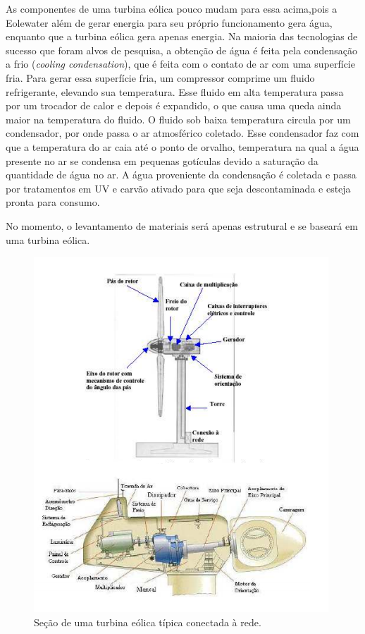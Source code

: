 
As componentes de uma turbina eólica pouco mudam para essa acima,pois a Eolewater além de gerar energia para seu próprio
funcionamento gera água, enquanto que a turbina eólica gera apenas energia. Na maioria das tecnologias de sucesso que foram alvos de pesquisa,
a obtenção de água é feita pela condensação  a frio (\textit{cooling condensation}), que é feita com o contato de 
ar com uma superfície fria. Para gerar essa superfície fria, um compressor comprime um fluido refrigerante, elevando sua
temperatura. Esse fluido em alta temperatura passa por um trocador de calor e depois é expandido, o que causa uma queda 
ainda maior na temperatura do fluido. O fluido sob baixa temperatura circula por um condensador, por onde passa o ar 
atmosférico coletado. Esse condensador faz com que a temperatura do ar caia até o ponto de orvalho, temperatura na qual a
água presente no ar se condensa em pequenas gotículas devido a saturação da quantidade de água no ar. A água proveniente
da condensação é coletada e passa por tratamentos em UV e carvão ativado para que seja descontaminada e esteja pronta para
consumo.



No momento, o levantamento de materiais será apenas estrutural e se baseará em uma turbina eólica.

\begin{figure}[!htbp]
\centering
\includegraphics[scale=0.80]{editaveis/figuras/turbina}
\caption[Seção de uma turbina eólica]{Seção de uma turbina eólica típica conectada à rede.\footnotemark}
\FloatBarrier
\label{secao_turbina_eolica}
\end{figure}

